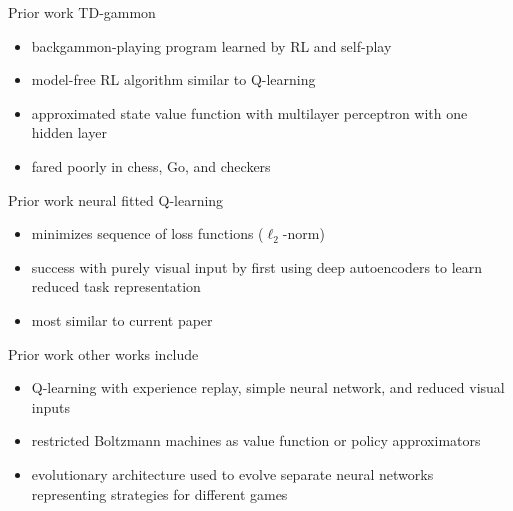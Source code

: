 \begin{frame}{Prior work}
    TD-gammon \cite{Tes:95}
    \vspace*{0.5em}
    \begin{itemize}\itemsep=12pt

        \item backgammon-playing program learned by RL and self-play

        \item model-free RL algorithm similar to Q-learning

        \item approximated state value function with multilayer perceptron with one hidden layer

        \item fared poorly in chess, Go, and checkers
        
    \end{itemize}
\end{frame}

\begin{frame}{Prior work}
    neural fitted Q-learning \cite{Rie:05}
    \vspace*{0.5em}
    \begin{itemize}\itemsep=12pt

        \item minimizes sequence of loss functions ($\ell_{2}$-norm)
    
        \item success with purely visual input by first using deep autoencoders to learn reduced task representation
    
        \item most similar to current paper
    
    \end{itemize}
\end{frame}

\begin{frame}{Prior work}
    other works include
    \vspace*{0.5em}
    \begin{itemize}\itemsep=12pt

        \item Q-learning with experience replay, simple neural network, and reduced visual inputs \cite{Lin:93}

        \item restricted Boltzmann machines as value function or policy approximators \cite{SH:04,HST:12}

        \item evolutionary architecture used to evolve separate neural networks representing strategies for different games \cite{HMS:13}

    \end{itemize}
\end{frame}

